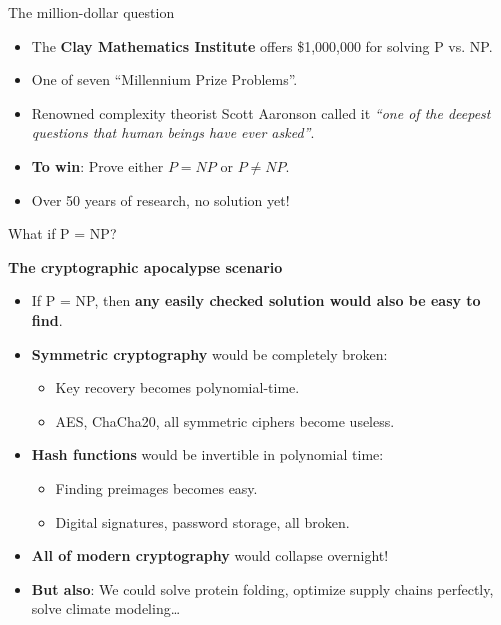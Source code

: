 \documentclass[aspectratio=169, lualatex, handout]{beamer}
\begin{document}
\begin{frame}{The million-dollar question}
	\begin{itemize}[<+->]
		\item The \textbf{Clay Mathematics Institute} offers \$1,000,000 for solving P vs. NP.
		\item One of seven ``Millennium Prize Problems''.
		\item Renowned complexity theorist Scott Aaronson called it \textit{``one of the deepest questions that human beings have ever asked''}.
		\item \textbf{To win}: Prove either $P = NP$ or $P \neq NP$.
		\item Over 50 years of research, no solution yet!
	\end{itemize}
\end{frame}

\begin{frame}{What if P = NP?}
	\begin{center}
		\Large\textbf{The cryptographic apocalypse scenario}
	\end{center}
	\begin{itemize}[<+->]
		\item If P = NP, then \textbf{any easily checked solution would also be easy to find}.
		\item \textbf{Symmetric cryptography} would be completely broken:
		      \begin{itemize}
			      \item Key recovery becomes polynomial-time.
			      \item AES, ChaCha20, all symmetric ciphers become useless.
		      \end{itemize}
		\item \textbf{Hash functions} would be invertible in polynomial time:
		      \begin{itemize}
			      \item Finding preimages becomes easy.
			      \item Digital signatures, password storage, all broken.
		      \end{itemize}
		\item \textbf{All of modern cryptography} would collapse overnight!
		\item \textbf{But also}: We could solve protein folding, optimize supply chains perfectly, solve climate modeling\ldots
	\end{itemize}
\end{frame}
\end{document}
